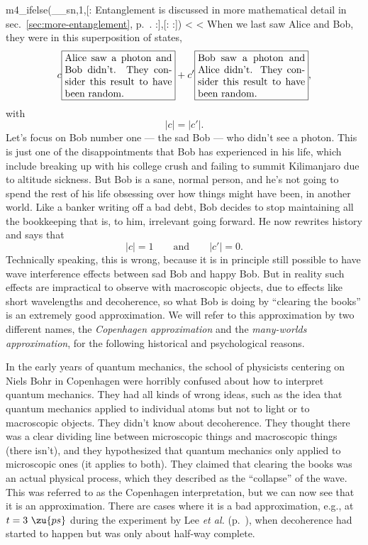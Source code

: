 m4_ifelse(__sn,1,[:
Entanglement is discussed in more mathematical detail in sec.~\ref{sec:more-entanglement}, p.~\pageref{sec:more-entanglement}.
:],[:
%
:])
<%
<%
When we last saw Alice and Bob, they were in this superposition of states,
\begin{equation*}
 c\fbox{\parbox{38mm}{Alice saw a photon and Bob didn't. They consider this result to have been random.}}
+c'\fbox{\parbox{38mm}{Bob saw a photon and Alice didn't. They consider this result to have been random.}},
\end{equation*}
with
\begin{equation*}
  |c|=|c'|.
\end{equation*}
Let's focus on Bob number one --- the sad Bob --- who didn't see a photon. This is just one of the disappointments
that Bob has experienced in his life, which include breaking up with his college crush and failing
to summit Kilimanjaro due to altitude sickness. But Bob is a sane, normal person, and he's not going
to spend the rest of his life obsessing over how things might have been, in another world. 
Like a banker writing off a bad debt, Bob decides to stop maintaining all the bookkeeping that is,
to him, irrelevant going forward. He now rewrites history and says that
\begin{equation*}
  |c|=1 \qquad \text{and} \qquad |c'|=0.
\end{equation*}
Technically speaking, this is wrong, because it is in principle still possible to have wave interference
effects between sad Bob and happy Bob. But in reality such effects are impractical to observe with
macroscopic objects, due to effects like short wavelengths and decoherence, so what Bob is doing
by ``clearing the books''
is an extremely good approximation. We will refer to this approximation by two different names,
the \emph{Copenhagen approximation} and the \emph{many-worlds approximation}, for the following historical and
psychological reasons.

In the early years of quantum mechanics, the school of
physicists\label{copenhagen-introduced} 
centering on Niels Bohr in Copenhagen were horribly confused about how
to interpret quantum mechanics. They had all kinds of wrong ideas,
such as the idea that quantum mechanics applied to individual atoms
but not to light or to macroscopic objects. They didn't know about
decoherence. They thought there was a clear dividing line between
microscopic things and macroscopic things (there isn't), and they
hypothesized that quantum mechanics only applied to microscopic ones
(it applies to both). They claimed that clearing the books was an
actual physical process, which they described as the ``collapse'' of
the wave. This was referred to as the Copenhagen interpretation, but
we can now see that it is an approximation. There are cases where it
is a bad approximation, e.g., at $t=3\ \zu{ps}$ during the experiment
by Lee \emph{et al.} (p.~\pageref{macroscopic-entanglement}), when
decoherence had started to happen but was only about half-way
complete.

